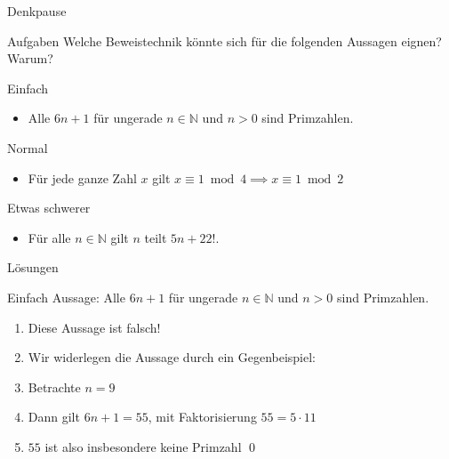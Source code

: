 {
\begin{frame}[fragile]{Denkpause}
    \begin{alertblock}{Aufgaben}
    Welche Beweistechnik könnte sich für die folgenden Aussagen eignen? Warum?
    \end{alertblock}
    
    \begin{block}{Einfach}
        \begin{itemize}
            \item Alle $6n+1$ für ungerade $n \in \mathbb{N}$ und $n > 0$ sind Primzahlen.
        \end{itemize}
    \end{block}
    \begin{block}{Normal}
    \begin{itemize}
            \item Für jede ganze Zahl $x$ gilt $x\equiv 1\bmod 4 \implies x\equiv 1\bmod 2$
    \end{itemize}
    \end{block}
    \begin{block}{Etwas schwerer}
        \begin{itemize}
            \item Für alle $n \in \mathbb{N}$ gilt $n$ teilt $5n + 22!$.
        \end{itemize}
    \end{block}
\end{frame}
}

{
\begin{frame}[fragile]{Lösungen}   
    \begin{block}{Einfach}
        Aussage: Alle $6n+1$ für ungerade $n \in \mathbb{N}$ und $n > 0$ sind Primzahlen.
        \begin{enumerate}
            \item<1-> Diese Aussage ist falsch!
            \item<2-> Wir widerlegen die Aussage durch ein Gegenbeispiel:
            \item<3-> Betrachte $n = 9$
            \item<4-> Dann gilt $6n+1 = 55$, mit Faktorisierung $55 = 5 \cdot 11$
            \item<5-> $55$ ist also insbesondere keine Primzahl \qed
        \end{enumerate}
    \end{block}
\end{frame}
}

